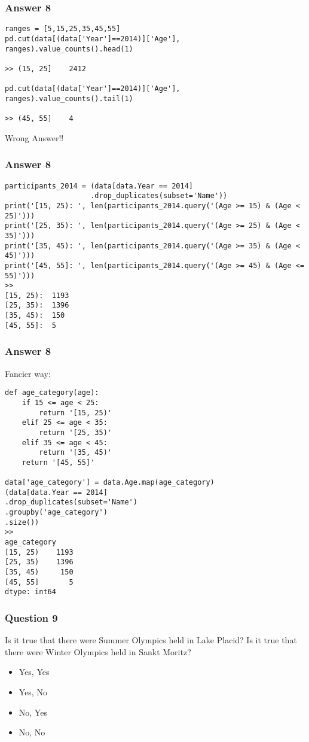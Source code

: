 \begin{frame}[fragile]\frametitle{Answer 8}
\begin{lstlisting}
ranges = [5,15,25,35,45,55]
pd.cut(data[(data['Year']==2014)]['Age'], ranges).value_counts().head(1)

>> (15, 25]    2412

pd.cut(data[(data['Year']==2014)]['Age'], ranges).value_counts().tail(1)

>> (45, 55]    4
\end{lstlisting}

Wrong Answer!!
\end{frame}

\begin{frame}[fragile]\frametitle{Answer 8}
\begin{lstlisting}
participants_2014 = (data[data.Year == 2014]
                    .drop_duplicates(subset='Name'))
print('[15, 25): ', len(participants_2014.query('(Age >= 15) & (Age < 25)')))
print('[25, 35): ', len(participants_2014.query('(Age >= 25) & (Age < 35)')))
print('[35, 45): ', len(participants_2014.query('(Age >= 35) & (Age < 45)')))
print('[45, 55]: ', len(participants_2014.query('(Age >= 45) & (Age <= 55)')))
>>
[15, 25):  1193
[25, 35):  1396
[35, 45):  150
[45, 55]:  5
\end{lstlisting}
\end{frame}

\begin{frame}[fragile]\frametitle{Answer 8}
Fancier way:
\begin{lstlisting}
def age_category(age):
    if 15 <= age < 25:
        return '[15, 25)'
    elif 25 <= age < 35:
        return '[25, 35)'
    elif 35 <= age < 45:
        return '[35, 45)'
    return '[45, 55]'

data['age_category'] = data.Age.map(age_category)
(data[data.Year == 2014]
.drop_duplicates(subset='Name')  
.groupby('age_category')
.size())
>>
age_category
[15, 25)    1193
[25, 35)    1396
[35, 45)     150
[45, 55]       5
dtype: int64
\end{lstlisting}
\end{frame}


\begin{frame}[fragile]\frametitle{Question 9}	
Is it true that there were Summer Olympics held in Lake Placid? Is it true that there were Winter Olympics held in Sankt Moritz?
\begin{itemize}
\item Yes, Yes
\item Yes, No
\item No, Yes
\item No, No
\end{itemize}

\end{frame}

